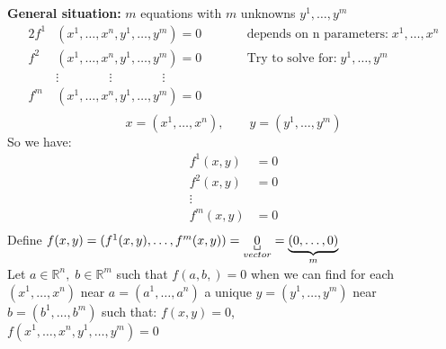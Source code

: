 \documentclass[12pt]{article}
\def\RR{\mathbb{R}}
\begin{document}
\textbf{General situation:} $m$ equations with $ m$ unknowns $y^1, \dots , y^m$
\begin{alignat*}{2}
f^1 &(x^1 , \dots , x^n , y^1 , \dots , y^m) = 0 &\qquad & \text{depends on n parameters:}\; x^1 , \dots , x^n\\
f^2 &(x^1 , \dots , x^n , y^1 , \dots , y^m)= 0 &\qquad & \text{Try to solve for:} \;  y^1 , \dots , y^m\\
&\vdots \qquad \qquad \vdots \qquad \qquad \vdots   		&\quad & \\
f^m &(x^1 , \dots , x^n , y^1 , \dots , y^m)= 0 &\quad &\\
\end{alignat*}
\[ x=(x^1 , \dots , x^n) , \qquad y=(y^1 , \dots , y^m)\]
So we have:
\begin{align*}
f^1(x,y) &=0\\
f^2(x,y) &=0\\
\vdots\\
f^m(x,y) &=0\\
\end{align*}
Define $f(x,y) = (f^1(x,y), \dots , f^m (x,y))=\underbracket[0.5pt]{0}_{vector} =\underbrace{(0,\dots,0)}_{
          \mathclap{m}}$\\
Let $a \in \RR^n , \; b \in \RR^m$ such that $f(a,b,) = 0$ when we can find for each $(x^1,  \dots, x^n) $  near $a=(a^1 , \dots , a^n )$ a unique $y=(y^1 , \dots , y^m )$ near $b= (b^1 , \dots , b^m)$ such that: $f(x,y)=0$, \\$f(x^1 , \dots , x^n , y^1 , \dots , y^m) = 0$
\end{document}
